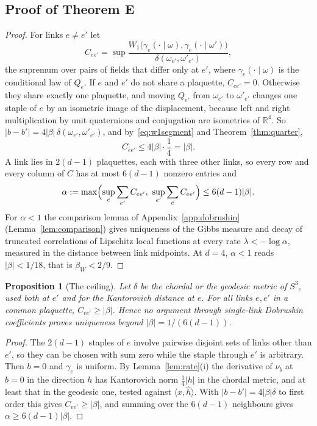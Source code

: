 \documentclass[aps,prd,twocolumn,superscriptaddress,nofootinbib,longbibliography,floatfix,amsmath,amssymb,10pt]{revtex4-2}
\newtheorem{proposition}[theorem]{Proposition}
\theoremstyle{definition}
\theoremstyle{remark}
\newcommand{\R}{\mathbb{R}}
\newcommand{\ip}[2]{\langle #1,#2\rangle}
\begin{document}
\subsection{Proof of Theorem E}

\begin{proof}
For links $e\ne e'$ let
\[
C_{ee'}=\sup\frac{W_1\bigl(\gamma_e(\cdot\mid\omega),\gamma_e(\cdot\mid
\omega')\bigr)}{\delta(\omega_{e'},\omega'_{e'})},
\]
the supremum over pairs of fields that differ only at $e'$, where
$\gamma_e(\cdot\mid\omega)$ is the conditional law of $Q_e$. If $e$ and $e'$
do not share a plaquette, $C_{ee'}=0$. Otherwise they share exactly one
plaquette, and moving $Q_{e'}$ from $\omega_{e'}$ to $\omega'_{e'}$ changes
one staple of $e$ by an isometric image of the displacement, because left
and right multiplication by unit quaternions and conjugation are isometries
of $\R^4$. So $|b-b'|=4|\beta|\,\delta(\omega_{e'},\omega'_{e'})$, and
by~\eqref{eq:w1segment} and Theorem~\ref{thm:quarter},
\[
C_{ee'}\le4|\beta|\cdot\frac14=|\beta| .
\]
A link lies in $2(d-1)$ plaquettes, each with three other links, so every row
and every column of $C$ has at most $6(d-1)$ nonzero entries and
\[
\alpha:=\max\Bigl(\sup_e\sum_{e'}C_{ee'},\ \sup_{e'}\sum_eC_{ee'}\Bigr)\le6(d-1)|\beta| .
\]
For $\alpha<1$ the comparison lemma of Appendix~\ref{app:dobrushin}
(Lemma~\ref{lem:comparison}) gives uniqueness of the Gibbs measure and
decay of truncated correlations of Lipschitz local functions at every rate
$\lambda<-\log\alpha$, measured in the distance between link midpoints. At
$d=4$, $\alpha<1$ reads $|\beta|<1/18$, that is $\beta_W<2/9$.
\end{proof}

\begin{proposition}[The ceiling]\label{prop:ceiling}
Let $\delta$ be the chordal or the geodesic metric of $S^3$, used both at
$e'$ and for the Kantorovich distance at $e$. For all links $e,e'$ in a
common plaquette, $C_{ee'}\ge|\beta|$. Hence no argument through single-link
Dobrushin coefficients proves uniqueness beyond $|\beta|=1/(6(d-1))$.
\end{proposition}

\begin{proof}
The $2(d-1)$ staples of $e$ involve pairwise disjoint sets of links other
than $e'$, so they can be chosen with sum zero while the staple through $e'$
is arbitrary. Then $b=0$ and $\gamma_e$ is uniform. By
Lemma~\ref{lem:rate}(i) the derivative of $\nu_b$ at $b=0$ in the direction
$h$ has Kantorovich norm $\frac14|h|$ in the chordal metric, and at least
that in the geodesic one, tested against $\ip x{\hat h}$. With
$|b-b'|=4|\beta|\delta$ to first order this gives $C_{ee'}\ge|\beta|$, and
summing over the $6(d-1)$ neighbours gives $\alpha\ge6(d-1)|\beta|$.
\end{proof}
\end{document}
